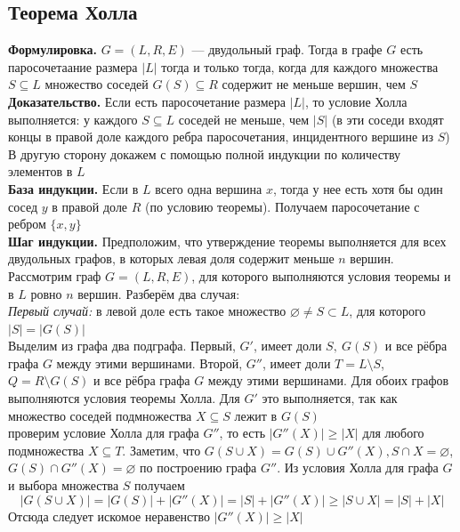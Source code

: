 \documentclass[a4paper]{article}
\begin{document}
\subsection{Теорема Холла}
\textbf{Формулировка.} $G=(L,R,E)$ — двудольный граф. Тогда в графе $G$ есть паросочетаание размера $|L|$ тогда и только тогда, когда для каждого множества $S\subseteq L$ множество соседей $G(S)\subseteq R$ содержит не меньше вершин, чем $S$\\[2mm]
\indent\textbf{Доказательство.} Если есть паросочетание размера $|L|$, то условие Холла выполняется: у каждого $S\subseteq L$ соседей не меньше, чем $|S|$ (в эти соседи входят концы в правой доле каждого ребра паросочетания, инцидентного вершине из $S$)\\[2mm]
\indent В другую сторону докажем с помощью полной индукции по количеству элементов в $L$\\[2mm]
\indent \textbf{База индукции.} Если в $L$ всего одна вершина $x$, тогда у нее есть хотя бы один сосед $y$ в правой доле $R$ (по условию теоремы). Получаем паросочетание с ребром  $\{x,y\}$\\[2mm]
\indent\textbf{Шаг индукции.} Предположим, что утверждение теоремы выполняется для всех двудольных графов, в которых левая доля содержит меньше $n$ вершин. Рассмотрим граф $G=(L, R, E)$, для которого выполняются условия теоремы и в $L$ ровно $n$ вершин. Разберём два случая:\\[2mm]
\indent \textit{Первый случай:} в левой доле есть такое множество $\varnothing \neq S \subset L$, для которого $|S|=|G(S)|$\\[2mm]
\indent Выделим из графа два подграфа. Первый, $G'$, имеет доли $S,\ G(S)$ и все рёбра графа $G$ между этими вершинами. Второй, $G''$, имеет доли $T=L\setminus S$, $Q=R \setminus G(S)$ и все рёбра графа $G$ между этими вершинами. Для обоих графов выполняются условия теоремы Холла. Для $G'$ это выполняется, так как множество соседей подмножества $X \subseteq S$ лежит в $G(S)$\\[2mm]
 проверим условие Холла для графа $G''$, то есть $\left|G''(X)\right| \geqslant|X|$ для любого подмножества $X \subseteq T$. Заметим, что $G(S \cup X)=G(S) \cup G''(X), S \cap X=\varnothing$, $G(S) \cap G''(X)=\varnothing$ по построению графа $G''$. Из условия Холла для графа $G$ и выбора множества $S$ получаем $$|G(S \cup X)|=|G(S)|+\left|G''(X)\right|=|S|+\left|G''(X)\right| \geqslant|S \cup X|=|S|+|X|$$
Отсюда следует искомое неравенство $\left|G''(X)\right| \geqslant|X|$\\[2mm]
\end{document}
